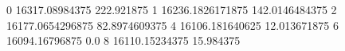 0 16317.08984375 222.921875
1 16236.1826171875 142.0146484375
2 16177.0654296875 82.8974609375
4 16106.181640625 12.013671875
6 16094.16796875 0.0
8 16110.15234375 15.984375
